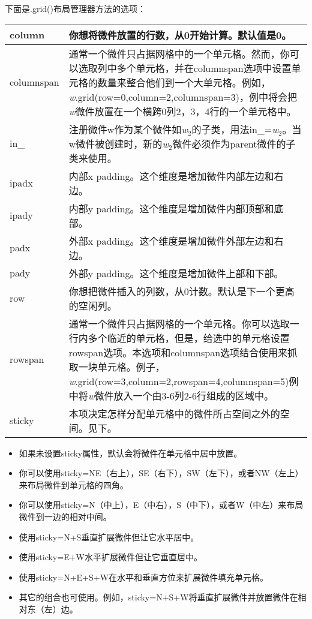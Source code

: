 \documentclass[11pt,a4paper,oneside]{book}
\begin{document}
下面是.grid()布局管理器方法的选项：
\begin{longtable}{|l|p{}|}

\hline
\textsf
column &
你想将微件放置的行数，从0开始计算。默认值是0。\\ \hline
columnspan & 
通常一个微件只占据网格中的一个单元格。然而，你可以选取列中多个单元格，并在columnspan选项中设置单元格的数量来整合他们到一个大单元格。例如，\textit{w}.grid(row=0,column=2,columnspan=3)，例中将会把\textit{w}微件放置在一个横跨0列2，3，4行的一个单元格中。\\ \hline
in\_ &
注册微件w作为某个微件如\textit{w$_2$}的子类，用法in\_=\textit{w$_2$}。当w微件被创建时，新的\textit{w$_2$}微件必须作为parent微件的子类来使用。\\ \hline
ipadx &
内部x padding。这个维度是增加微件内部左边和右边。\\ \hline
ipady &
内部y padding。这个维度是增加微件内部顶部和底部。\\ \hline
padx &
外部x padding。这个维度是增加微件外部左边和右边。\\ \hline
pady &
外部y padding。这个维度是增加微件上部和下部。\\ \hline
row &
你想把微件插入的列数，从0计数。默认是下一个更高的空闲列。\\ \hline
rowspan &
通常一个微件只占据网格的一个单元格。你可以选取一行内多个临近的单元格，但是，给选中的单元格设置rowspan选项。本选项和columnspan选项结合使用来抓取一块单元格。例子，\textit{w}.grid(row=3,column=2,rowspan=4,columnspan=5)例中将\textit{w}微件放入一个由3-6列2-6行组成的区域中。\\ \hline
sticky &
本项决定怎样分配单元格中的微件所占空间之外的空间。见下。\\ \hline
\end{longtable}
\begin{itemize}
\sffamily
\item 如果未设置sticky属性，默认会将微件在单元格中居中放置。

\item 你可以使用sticky=NE（右上），SE（右下），SW（左下），或者NW（左上）来布局微件到单元格的四角。

\item 你可以使用sticky=N（中上），E（中右），S（中下），或者W（中左）来布局微件到一边的相对中间。

\item 使用sticky=N+S垂直扩展微件但让它水平居中。

\item 使用sticky=E+W水平扩展微件但让它垂直居中。

\item 使用sticky=N+E+S+W在水平和垂直方位来扩展微件填充单元格。

\item 其它的组合也可使用。例如，sticky=N+S+W将垂直扩展微件并放置微件在相对东（左）边。
\end{itemize}
\end{document}
